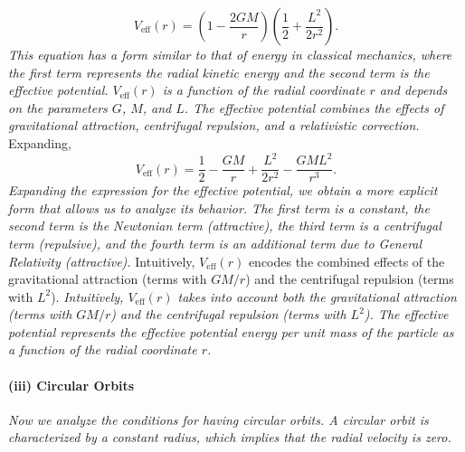 \begin{equation}
V_{\mathrm{eff}}(r) = \left(1 - \frac{2GM}{r}\right)\left(\frac{1}{2} + \frac{L^2}{2r^2}\right).
\end{equation}
\textit{This equation has a form similar to that of energy in classical mechanics, where the first term represents the radial kinetic energy and the second term is the effective potential. $V_{\mathrm{eff}}(r)$ is a function of the radial coordinate $r$ and depends on the parameters $G$, $M$, and $L$. The effective potential combines the effects of gravitational attraction, centrifugal repulsion, and a relativistic correction.}
Expanding,
\begin{equation}
V_{\mathrm{eff}}(r) = \frac{1}{2} - \frac{GM}{r} + \frac{L^2}{2r^2} - \frac{GM L^2}{r^3}.
\end{equation}
\textit{Expanding the expression for the effective potential, we obtain a more explicit form that allows us to analyze its behavior. The first term is a constant, the second term is the Newtonian term (attractive), the third term is a centrifugal term (repulsive), and the fourth term is an additional term due to General Relativity (attractive).}
Intuitively, $V_{\mathrm{eff}}(r)$ encodes the combined effects of the gravitational attraction (terms with $GM/r$) and the centrifugal repulsion (terms with $L^2$).
\textit{Intuitively, $V_{\mathrm{eff}}(r)$ takes into account both the gravitational attraction (terms with $GM/r$) and the centrifugal repulsion (terms with $L^2$). The effective potential represents the effective potential energy per unit mass of the particle as a function of the radial coordinate $r$.}

\paragraph{(iii) Circular Orbits}
\textit{Now we analyze the conditions for having circular orbits. A circular orbit is characterized by a constant radius, which implies that the radial velocity is zero.}

